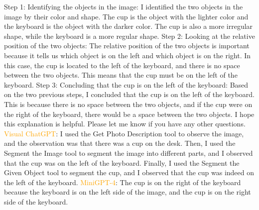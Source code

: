 \begin{enumerate}
        Step 1: Identifying the objects in the image: I identified the two objects in the image by their color and shape. The cup is the object with the lighter color and the keyboard is the object with the darker color. The cup is also a more irregular shape, while the keyboard is a more regular shape.
        Step 2: Looking at the relative position of the two objects: The relative position of the two objects is important because it tells us which object is on the left and which object is on the right. In this case, the cup is located to the left of the keyboard, and there is no space between the two objects. This means that the cup must be on the left of the keyboard.
        Step 3: Concluding that the cup is on the left of the keyboard: Based on the two previous steps, I concluded that the cup is on the left of the keyboard. This is because there is no space between the two objects, and if the cup were on the right of the keyboard, there would be a space between the two objects.
        I hope this explanation is helpful. Please let me know if you have any other questions.
        \subitem \textcolor{orange}{Visual ChatGPT}: I used the Get Photo Description tool to observe the image, and the observation was that there was a cup on the desk. Then, I used the Segment the Image tool to segment the image into different parts, and I observed that the cup was on the left of the keyboard. Finally, I used the Segment the Given Object tool to segment the cup, and I observed that the cup was indeed on the left of the keyboard.
        \subitem \textcolor{orange}{MiniGPT-4}: The cup is on the right of the keyboard because the keyboard is on the left side of the image, and the cup is on the right side of the keyboard.
    \end{enumerate}
